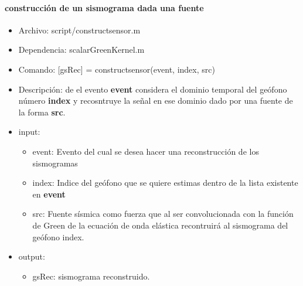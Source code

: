 \paragraph{construcción de un sismograma dada una fuente}
\begin{itemize}
  \item Archivo: script/constructsensor.m
  \item Dependencia: scalarGreenKernel.m
  \item Comando: [gsRec] = constructsensor(event, index, src)
  \item Descripción: de el evento \textbf{event} considera el dominio temporal
  del geófono número \textbf{index} y recosntruye la señal en ese dominio dado
  por una fuente de la forma \textbf{src}.
  \item input:
  \begin{itemize}
    \item event: Evento del cual se desea hacer una reconstrucción de los 
    sismogramas
    \item index: Indice del geófono que se quiere estimas dentro de la lista 
    existente en \textbf{event}
    \item src: Fuente sísmica como fuerza que al ser convolucionada con la 
    función de Green de la ecuación de onda elástica recontruirá al sismograma 
    del geófono index.
  \end{itemize}
  \item output:
  \begin{itemize}
    \item gsRec: sismograma reconstruido.
  \end{itemize}
\end{itemize}


